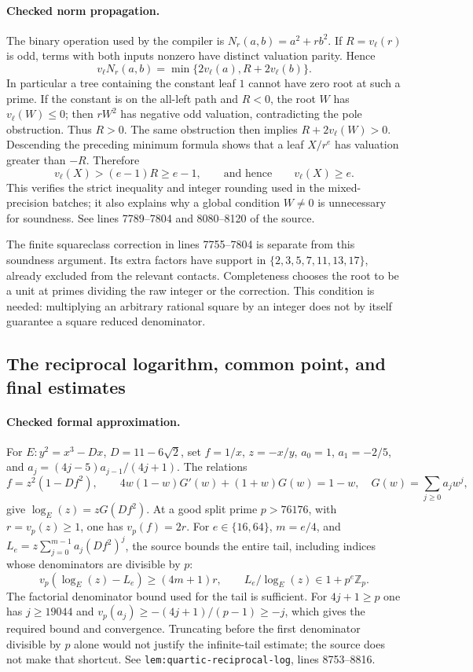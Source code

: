 \documentclass[11pt]{article}
\theoremstyle{definition}
\begin{document}
\paragraph{Checked norm propagation.}
The binary operation used by the compiler is
$N_r(a,b)=a^2+rb^2$.  If $R=v_\ell(r)$ is odd, terms with both inputs
nonzero have distinct valuation parity.  Hence
\[
 v_\ell N_r(a,b)=\min\{2v_\ell(a),R+2v_\ell(b)\}.
\]
In particular a tree containing the constant leaf $1$ cannot have zero
root at such a prime.  If the constant is on the all-left path and
$R<0$, the root $W$ has $v_\ell(W)\le0$; then $rW^2$ has negative
odd valuation, contradicting the pole obstruction.  Thus $R>0$.
The same obstruction then implies
$R+2v_\ell(W)>0$.  Descending the preceding minimum formula shows
that a leaf $X/r^e$ has valuation greater than $-R$.  Therefore
\[
 v_\ell(X)>(e-1)R\ge e-1,
 \qquad\text{and hence}\qquad v_\ell(X)\ge e.
\]
This verifies the strict inequality and integer rounding used in the
mixed-precision batches; it also explains why a global condition
$W\ne0$ is unnecessary for soundness.  See lines 7789--7804 and
8080--8120 of the source.

The finite squareclass correction in lines 7755--7804 is separate from
this soundness argument.  Its extra factors have support in
$\{2,3,5,7,11,13,17\}$, already excluded from the relevant contacts.
Completeness chooses the root to be a unit at primes dividing the raw
integer or the correction.  This condition is needed: multiplying an
arbitrary rational square by an integer does not by itself guarantee a
square reduced denominator.

\subsection{The reciprocal logarithm, common point, and final estimates}

\paragraph{Checked formal approximation.}
For $E:y^2=x^3-Dx$, $D=11-6\sqrt2$, set $f=1/x$, $z=-x/y$,
$a_0=1$, $a_1=-2/5$, and
$a_j=(4j-5)a_{j-1}/(4j+1)$.  The relations
\[
 f=z^2(1-Df^2),\qquad
 4w(1-w)G'(w)+(1+w)G(w)=1-w,
 \quad G(w)=\sum_{j\ge0}a_jw^j,
\]
give $\log_E(z)=zG(Df^2)$.  At a good split prime $p>76176$,
with $r=v_p(z)\ge1$, one has $v_p(f)=2r$.
For $e\in\{16,64\}$, $m=e/4$, and
$L_e=z\sum_{j=0}^{m-1}a_j(Df^2)^j$, the source bounds the entire
tail, including indices whose denominators are divisible by $p$:
\[
 v_p(\log_E(z)-L_e)\ge(4m+1)r,
 \qquad L_e/\log_E(z)\in1+p^e\mathbb Z_p.
\]
The factorial denominator bound used for the tail is sufficient.
For $4j+1\ge p$ one has $j\ge19044$ and
$v_p(a_j)\ge-(4j+1)/(p-1)\ge-j$, which gives the required bound
and convergence.  Truncating before the first denominator divisible by
$p$ alone would not justify the infinite-tail estimate; the source does
not make that shortcut.  See \texttt{lem:quartic-reciprocal-log},
lines 8753--8816.
\end{document}
